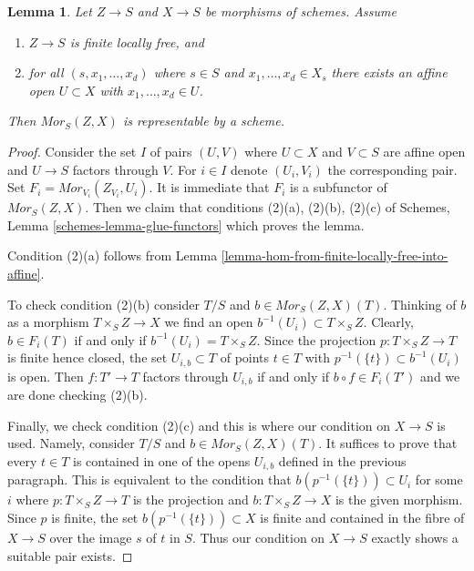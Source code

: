 \documentclass[10pt,a4paper]{amsart}
\theoremstyle{plain}
\newtheorem{lemma}[subsection]{Lemma}
\theoremstyle{definition}
\theoremstyle{remark}
\numberwithin{equation}{subsection}
\begin{document}
\begin{lemma}
\label{lemma-hom-from-finite-locally-free-representable}
Let $Z \to S$ and $X \to S$ be morphisms of schemes.
Assume
\begin{enumerate}
\item $Z \to S$ is finite locally free, and
\item for all $(s, x_1, \ldots, x_d)$ where $s \in S$ and
$x_1, \ldots, x_d \in X_s$ there exists an affine open $U \subset X$
with $x_1, \ldots, x_d \in U$.
\end{enumerate}
Then $\mathit{Mor}_S(Z, X)$ is representable by a scheme.
\end{lemma}

\begin{proof}
Consider the set $I$ of pairs $(U, V)$ where $U \subset X$ and $V \subset S$
are affine open and $U \to S$ factors through $V$. For $i \in I$ denote
$(U_i, V_i)$ the corresponding pair. Set
$F_i = \mathit{Mor}_{V_i}(Z_{V_i}, U_i)$.
It is immediate that $F_i$ is a subfunctor of $\mathit{Mor}_S(Z, X)$.
Then we claim that conditions
(2)(a), (2)(b), (2)(c) of
Schemes, Lemma \ref{schemes-lemma-glue-functors} which proves the lemma.

\medskip\noindent
Condition (2)(a) follows from
Lemma \ref{lemma-hom-from-finite-locally-free-into-affine}.

\medskip\noindent
To check condition (2)(b) consider $T/S$ and $b \in \mathit{Mor}_S(Z, X)(T)$.
Thinking of $b$ as a morphism $T \times_S Z \to X$ we find an open
$b^{-1}(U_i) \subset T \times_S Z$. Clearly, $b \in F_i(T)$
if and only if $b^{-1}(U_i) = T \times_S Z$. Since the projection
$p : T \times_S Z \to T$ is finite hence closed, the set
$U_{i, b} \subset T$ of points $t \in T$ with
$p^{-1}(\{t\}) \subset b^{-1}(U_i)$ is open.
Then $f : T' \to T$ factors through $U_{i, b}$ if and only
if $b \circ f \in F_i(T')$ and we are done checking (2)(b).

\medskip\noindent
Finally, we check condition (2)(c) and this is where our condition
on $X \to S$ is used. Namely, consider
$T/S$ and $b \in \mathit{Mor}_S(Z, X)(T)$.
It suffices to prove that every $t \in T$
is contained in one of the opens $U_{i, b}$ defined
in the previous paragraph.
This is equivalent to the condition that
$b(p^{-1}(\{t\})) \subset U_i$ for some $i$
where $p : T \times_S Z \to T$ is the projection and
$b : T \times_S Z \to X$ is the given morphism.
Since $p$ is finite, the set $b(p^{-1}(\{t\})) \subset X$
is finite and contained in the fibre of $X \to S$ over
the image $s$ of $t$ in $S$.
Thus our condition on $X \to S$ exactly shows a
suitable pair exists.
\end{proof}
\end{document}
